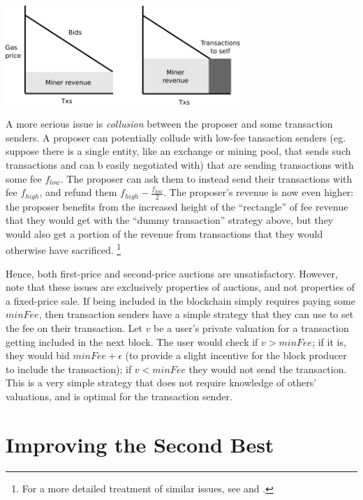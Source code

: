 \documentclass[12pt, final]{article}
\begin{document}
\begin{center}
\includegraphics[width=3.5in]{kth_price_revenue.png} \\
\end{center}

A more serious issue is \emph{collusion} between the proposer and some transaction senders. A proposer can potentially collude with low-fee tansaction senders (eg. suppose there is a single entity, like an exchange or mining pool, that sends such transactions and can b easily negotiated with) that are sending transactions with some fee $f_{low}$. The proposer can ask them to instead send their transactions with fee $f_{high}$, and refund them $f_{high} - \frac{f_{low}}{2}$. The proposer's revenue is now even higher: the proposer benefits from the increased height of the ``rectangle'' of fee revenue that they would get with the ``dummy transaction'' strategy above, but they would also get a portion of the revenue from transactions that they would otherwise have sacrificed. \footnote{For a more detailed treatment of similar issues, see \cite{li2018} and \cite{rothkopf2007}.}

Hence, both first-price and second-price auctions are unsatisfactory. However, note that these issues are exclusively properties of auctions, and not properties of a fixed-price sale. If being included in the blockchain simply requires paying some $minFee$, then transaction senders have a simple strategy that they can use to set the fee on their transaction. Let $v$ be a user's private valuation for a transaction getting included in the next block. The user would check if $v > minFee$; if it is, they would bid $minFee + \epsilon$ (to provide a slight incentive for the block producer to include the transaction); if $v < minFee$ they would not send the transaction. This is a very simple strategy that does not require knowledge of others' valuations, and is optimal for the transaction sender.

\section{Improving the Second Best}
\end{document}
